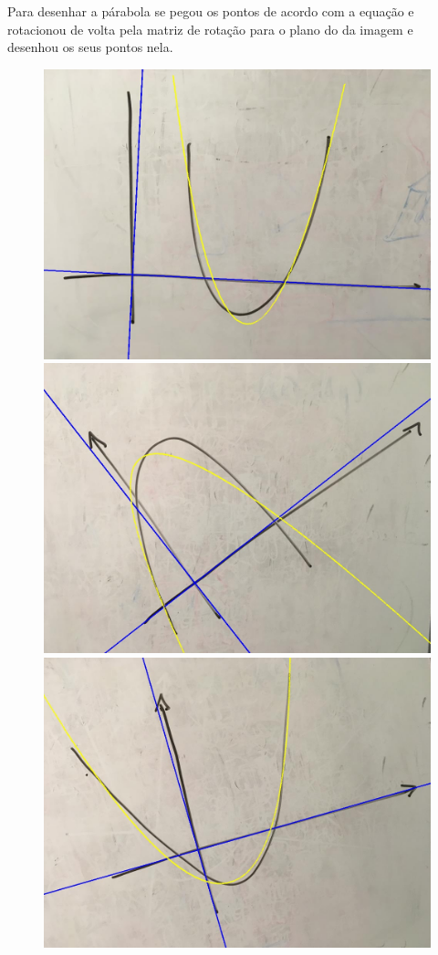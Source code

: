 \documentclass{article}
\begin{document}
Para desenhar a párabola se pegou os pontos de acordo com a equação e rotacionou de volta pela matriz de rotação para o plano do da imagem e desenhou os seus pontos nela.

\begin{figure}[h!]
   \centering
    \subfigure
        {\includegraphics[scale=0.1]{exemplo1ParaboleImage.jpg}}
    \subfigure
        {\includegraphics[scale=0.1]{exemplo2ParaboleImage.jpg}}
    \subfigure
        {\includegraphics[scale=0.1]{exemplo3ParaboleImage.jpg}}

\end{figure}
\end{document}

